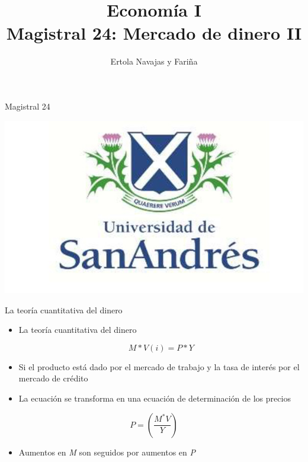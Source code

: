 \documentclass{beamer}
\title[Economía I]{Economía I \vspace{4mm}
\\ Magistral 24: Mercado de dinero II}
\date{}
\author[Ertola Navajas y Fariña]{Ertola Navajas y Fariña}
\institute[]{Universidad de San Andrés}
\begin{document}
\begin{frame}
\titlepage
\centering
Magistral 24

\includegraphics[scale=0.2]{Slides Principios de Economia/Figures/logoUDESA.jpg} 
\end{frame}



\begin{frame}{La teoría cuantitativa del dinero}
\begin{itemize}
        \item La teoría cuantitativa del dinero
        \vspace{0.3cm}
                \begin{tcolorbox}[width=4in,
                  interior hidden,
                  boxsep=0pt,
                  left=0pt,
                  right=0pt,
                  top=2pt,
                  ]%
                                 $$M*V(i)=P*Y$$
                \end{tcolorbox} 
        \item Si el producto está dado por el mercado de trabajo y la tasa de interés por el mercado de crédito
        \item La ecuación se transforma en una ecuación de determinación de los precios
    \end{itemize}
    \begin{itemize}
    \begin{tcolorbox}[width=4in,
                  interior hidden,
                  boxsep=0pt,
                  left=0pt,
                  right=0pt,
                  top=2pt,
                  ]%
                                 $$P=\left(\frac{M^{*} V}{Y}\right)$$
                \end{tcolorbox} 
    \end{itemize}
    \begin{itemize}
        \item Aumentos en \textit{M} son seguidos por aumentos en \textit{P}
    \end{itemize}
\end{frame}
\end{document}
